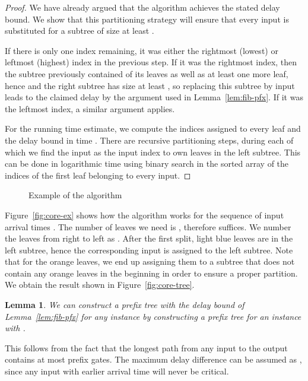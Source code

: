 \documentclass[11pt,final,microtype]{scrartcl}
\theoremstyle{plain}
\newtheorem{lemma}[theorem]{Lemma}
\theoremstyle{definition}
\theoremstyle{remark}
\newcommand{\tikzc}[3]{
  \centering{
    \resizebox{#2\linewidth}{!}{
      \begin{tikzpicture}
        
      \end{tikzpicture}
    }
    \caption{#1}
    \label{fig:#3}}
}
\begin{document}
\begin{proof} We have already argued that the algorithm achieves the stated delay
  bound. We show that this partitioning strategy will ensure that
  every input  is substituted for a subtree of size at least
  .

  If there is only one index  remaining, it was either the
  rightmost (lowest) or leftmost (highest) index in the previous
  step. If it was the rightmost index, then the subtree previously
  contained  of its leaves as well as at least one more
  leaf, hence  and the right subtree has size at least
  , so replacing this subtree by input  leads to the
  claimed delay by the argument used in Lemma~\ref{lem:fib-pfx}. If it
  was the leftmost index, a similar argument applies.

  For the running time estimate, we compute the indices assigned to
  every leaf and the delay bound  in time . There are  recursive
  partitioning steps, during each of which we find the input  as
  the input index to own leaves in the left subtree. This can be done
  in logarithmic time using binary search in the sorted array of the
  indices of the first leaf belonging to every input.
\end{proof}
\begin{figure}[htb]
  \centering
  \begin{subfigure}[b]{0.5\linewidth}
    \tikzc{Algorithm for input arrival times }{1}{core-ex}
  \end{subfigure}
  \begin{subfigure}[b]{0.16\linewidth}
    \tikzc{Prefix tree}{1}{core-tree}
  \end{subfigure}
  \caption{Example of the algorithm}
  \label{fig:alg-ex}
\end{figure}

Figure~\ref{fig:core-ex} shows how the algorithm works for the
sequence of input arrival times . The number of leaves
we need is , therefore  suffices. We
number the leaves from right to left as . After the
first split,  light blue leaves are in the left subtree, hence the
corresponding input is assigned to the left subtree.  Note that for
the orange leaves, we end up assigning them to a subtree that does not
contain any orange leaves in the beginning in order to ensure a proper
partition. We obtain the result shown in Figure~\ref{fig:core-tree}.

\begin{lemma} \label{lem:reduction}
  We can construct a prefix tree with the delay bound of
  Lemma~\ref{lem:fib-pfx} for any instance  by
  constructing a prefix tree for an instance 
  with .
\end{lemma}
This follows from the fact that the longest path from any input to the
output contains at most  prefix gates. The maximum delay
difference can be assumed as , since any input with earlier
arrival time will never be critical.
\end{document}
